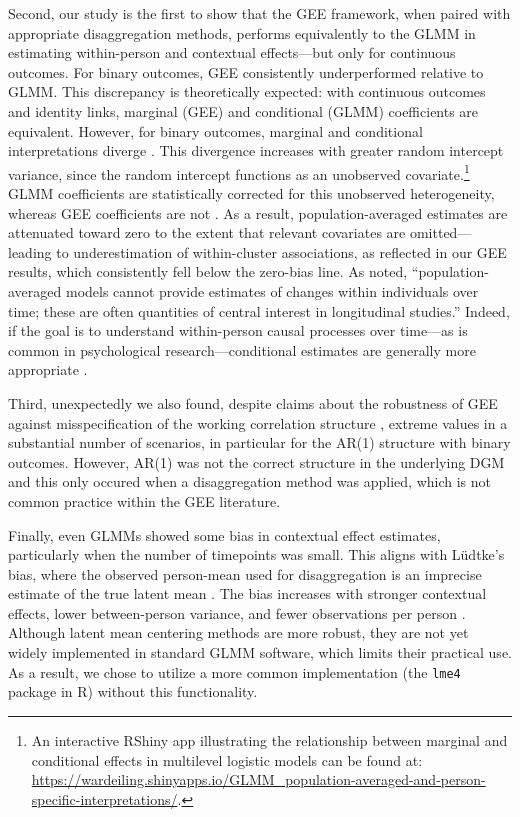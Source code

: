 Second, our study is the first to show that the GEE framework, when paired with appropriate disaggregation methods, performs equivalently to the GLMM in estimating within-person and contextual effects—but only for continuous outcomes. For binary outcomes, GEE consistently underperformed relative to GLMM. This discrepancy is theoretically expected: with continuous outcomes and identity links, marginal (GEE) and conditional (GLMM) coefficients are equivalent. However, for binary outcomes, marginal and conditional interpretations diverge \parencite[]{neuhaus_comparison_1991}. This divergence increases with greater random intercept variance, since the random intercept functions as an unobserved covariate.\footnote{An interactive RShiny app illustrating the relationship between marginal and conditional effects in multilevel logistic models can be found at: \href{https://wardeiling.shinyapps.io/GLMM_population-averaged-and-person-specific-interpretations/}{https://wardeiling.shinyapps.io/GLMM\_population-averaged-and-person-specific-interpretations/}.} GLMM coefficients are statistically corrected for this unobserved heterogeneity, whereas GEE coefficients are not \parencite[p. 28]{neuhaus_comparison_1991, zeger_models_1988}. As a result, population-averaged estimates are attenuated toward zero to the extent that relevant covariates are omitted—leading to underestimation of within-cluster associations, as reflected in our GEE results, which consistently fell below the zero-bias line. As \textcite[p. 33]{neuhaus_comparison_1991} noted, ``population-averaged models cannot provide estimates of changes within individuals over time; these are often quantities of central interest in longitudinal studies.'' Indeed, if the goal is to understand within-person causal processes over time---as is common in psychological research---conditional estimates are generally more appropriate \parencite[p. 78]{allison_logistic_1999}.

Third, unexpectedly we also found, despite claims about the robustness of GEE against misspecification of the working correlation structure \parencite[e.g.,][]{zeger_models_1988, ballinger_using_2004}, extreme values in a substantial number of scenarios, in particular for the AR(1) structure with binary outcomes. However, AR(1) was not the correct structure in the underlying DGM and this only occured when a disaggregation method was applied, which is not common practice within the GEE literature. 

Finally, even GLMMs showed some bias in contextual effect estimates, particularly when the number of timepoints was small. This aligns with Lüdtke’s bias, where the observed person-mean used for disaggregation is an imprecise estimate of the true latent mean \parencite{ludtke_multilevel_2008}. The bias increases with stronger contextual effects, lower between-person variance, and fewer observations per person \parencite{asparouhov_latent_2019}. Although latent mean centering methods are more robust, they are not yet widely implemented in standard GLMM software, which limits their practical use. As a result, we chose to utilize a more common implementation (the \texttt{lme4} package in R) without this functionality.

